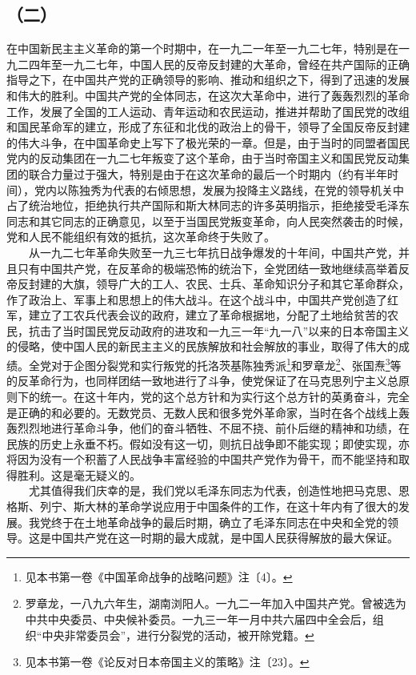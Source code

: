 \documentclass[cn,11pt,chinese]{elegantbook}
\def\myformat#1{\hfil\hfil #1}
\begin{document}
\subsection*{\myformat{（二）}}
在中国新民主主义革命的第一个时期中，在一九二一年至一九二七年，特别是在一九二四年至一九二七年，中国人民的反帝反封建的大革命，曾经在共产国际的正确指导之下，在中国共产党的正确领导的影响、推动和组织之下，得到了迅速的发展和伟大的胜利。中国共产党的全体同志，在这次大革命中，进行了轰轰烈烈的革命工作，发展了全国的工人运动、青年运动和农民运动，推进并帮助了国民党的改组和国民革命军的建立，形成了东征和北伐的政治上的骨干，领导了全国反帝反封建的伟大斗争，在中国革命史上写下了极光荣的一章。但是，由于当时的同盟者国民党内的反动集团在一九二七年叛变了这个革命，由于当时帝国主义和国民党反动集团的联合力量过于强大，特别是由于在这次革命的最后一个时期内（约有半年时间），党内以陈独秀为代表的右倾思想，发展为投降主义路线，在党的领导机关中占了统治地位，拒绝执行共产国际和斯大林同志的许多英明指示，拒绝接受毛泽东同志和其它同志的正确意见，以至于当国民党叛变革命，向人民突然袭击的时候，党和人民不能组织有效的抵抗，这次革命终于失败了。\\
　　从一九二七年革命失败至一九三七年抗日战争爆发的十年间，中国共产党，并且只有中国共产党，在反革命的极端恐怖的统治下，全党团结一致地继续高举着反帝反封建的大旗，领导广大的工人、农民、士兵、革命知识分子和其它革命群众，作了政治上、军事上和思想上的伟大战斗。在这个战斗中，中国共产党创造了红军，建立了工农兵代表会议的政府，建立了革命根据地，分配了土地给贫苦的农民，抗击了当时国民党反动政府的进攻和一九三一年“九一八”以来的日本帝国主义的侵略，使中国人民的新民主主义的民族解放和社会解放的事业，取得了伟大的成绩。全党对于企图分裂党和实行叛党的托洛茨基陈独秀派\footnote[1]{ 见本书第一卷《中国革命战争的战略问题》注〔4〕。}和罗章龙\footnote[2]{ 罗章龙，一八九六年生，湖南浏阳人。一九二一年加入中国共产党。曾被选为中共中央委员、中央候补委员。一九三一年一月中共六届四中全会后，组织“中央非常委员会”，进行分裂党的活动，被开除党籍。}、张国焘\footnote[3]{ 见本书第一卷《论反对日本帝国主义的策略》注〔23〕。}等的反革命行为，也同样团结一致地进行了斗争，使党保证了在马克思列宁主义总原则下的统一。在这十年内，党的这个总方针和为实行这个总方针的英勇奋斗，完全是正确的和必要的。无数党员、无数人民和很多党外革命家，当时在各个战线上轰轰烈烈地进行革命斗争，他们的奋斗牺牲、不屈不挠、前仆后继的精神和功绩，在民族的历史上永垂不朽。假如没有这一切，则抗日战争即不能实现；即使实现，亦将因为没有一个积蓄了人民战争丰富经验的中国共产党作为骨干，而不能坚持和取得胜利。这是毫无疑义的。\\
　　尤其值得我们庆幸的是，我们党以毛泽东同志为代表，创造性地把马克思、恩格斯、列宁、斯大林的革命学说应用于中国条件的工作，在这十年内有了很大的发展。我党终于在土地革命战争的最后时期，确立了毛泽东同志在中央和全党的领导。这是中国共产党在这一时期的最大成就，是中国人民获得解放的最大保证。\\
\end{document}
